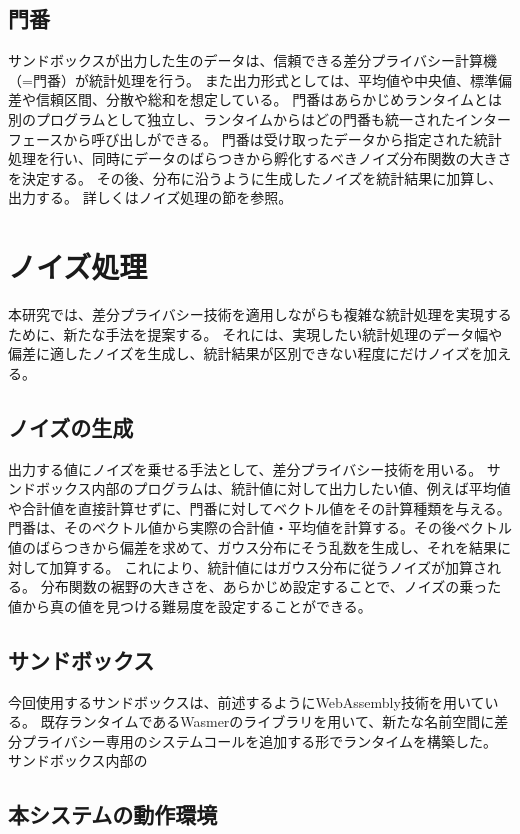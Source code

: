 \documentclass[a4paper,11pt]{jreport}
\begin{document}
\subsection{門番}

サンドボックスが出力した生のデータは、信頼できる差分プライバシー計算機（=門番）が統計処理を行う。
また出力形式としては、平均値や中央値、標準偏差や信頼区間、分散や総和を想定している。
門番はあらかじめランタイムとは別のプログラムとして独立し、ランタイムからはどの門番も統一されたインターフェースから呼び出しができる。
門番は受け取ったデータから指定された統計処理を行い、同時にデータのばらつきから孵化するべきノイズ分布関数の大きさを決定する。
その後、分布に沿うように生成したノイズを統計結果に加算し、出力する。
詳しくはノイズ処理の節を参照。

\section{ノイズ処理}
本研究では、差分プライバシー技術を適用しながらも複雑な統計処理を実現するために、新たな手法を提案する。
それには、実現したい統計処理のデータ幅や偏差に適したノイズを生成し、統計結果が区別できない程度にだけノイズを加える。

\subsection{ノイズの生成}

出力する値にノイズを乗せる手法として、差分プライバシー技術を用いる。
サンドボックス内部のプログラムは、統計値に対して出力したい値、例えば平均値や合計値を直接計算せずに、門番に対してベクトル値をその計算種類を与える。
門番は、そのベクトル値から実際の合計値・平均値を計算する。その後ベクトル値のばらつきから偏差を求めて、ガウス分布にそう乱数を生成し、それを結果に対して加算する。
これにより、統計値にはガウス分布に従うノイズが加算される。
分布関数の裾野の大きさを、あらかじめ設定することで、ノイズの乗った値から真の値を見つける難易度を設定することができる。

\subsection{サンドボックス}

今回使用するサンドボックスは、前述するようにWebAssembly技術を用いている。
既存ランタイムであるWasmerのライブラリを用いて、新たな名前空間に差分プライバシー専用のシステムコールを追加する形でランタイムを構築した。
サンドボックス内部の

\subsection{本システムの動作環境}
\end{document}
